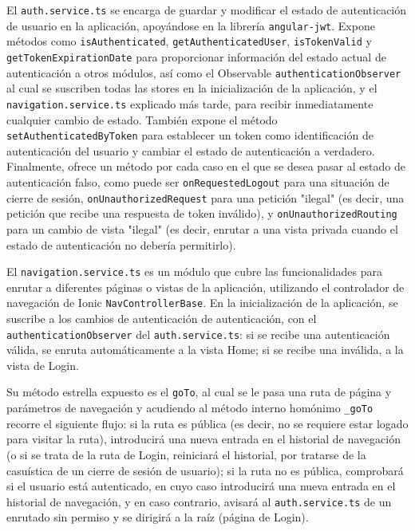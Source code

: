 \vspace{1cm}

El \verb|auth.service.ts| se encarga de guardar y modificar el estado de autenticación de usuario en la aplicación, apoyándose en la librería \verb|angular-jwt|. Expone métodos como \verb|isAuthenticated|, \verb|getAuthenticatedUser|, \verb|isTokenValid| y \verb|getTokenExpirationDate| para proporcionar información del estado actual de autenticación a otros módulos, así como el Observable \verb|authenticationObserver| al cual se suscriben todas las stores en la inicialización de la aplicación, y el \verb|navigation.service.ts| explicado más tarde, para recibir inmediatamente cualquier cambio de estado. También expone el método \verb|setAuthenticatedByToken| para establecer un token como identificación de autenticación del usuario y cambiar el estado de autenticación a verdadero. Finalmente, ofrece un método por cada caso en el que se desea pasar al estado de autenticación falso, como puede ser \verb|onRequestedLogout| para una situación de cierre de sesión, \verb|onUnauthorizedRequest| para una petición "ilegal" (es decir, una petición que recibe una respuesta de token inválido), y \verb|onUnauthorizedRouting| para un cambio de vista "ilegal" (es decir, enrutar a una vista privada cuando el estado de autenticación no debería permitirlo). 

\vspace{1cm}

El \verb|navigation.service.ts| es un módulo que cubre las funcionalidades para enrutar a diferentes páginas o vistas de la aplicación, utilizando el controlador de navegación de Ionic \verb|NavControllerBase|. En la inicialización de la aplicación, se suscribe a los cambios de autenticación de autenticación, con el \verb|authenticationObserver| del \verb|auth.service.ts|: si se recibe una autenticación válida, se enruta automáticamente a la vista Home; si se recibe una inválida, a la vista de Login.

\vspace{0.5cm}

Su método estrella expuesto es el \verb|goTo|, al cual se le pasa una ruta de página y parámetros de navegación y acudiendo al método interno homónimo \verb|_goTo| recorre el siguiente flujo: si la ruta es pública (es decir, no se requiere estar logado para visitar la ruta), introducirá una nueva entrada en el historial de navegación (o si se trata de la ruta de Login, reiniciará el historial, por tratarse de la casuística de un cierre de sesión de usuario); si la ruta no es pública, comprobará si el usuario está autenticado, en cuyo caso introducirá una nueva entrada en el historial de navegación, y en caso contrario, avisará al \verb|auth.service.ts| de un enrutado sin permiso y se dirigirá a la raíz (página de Login).

